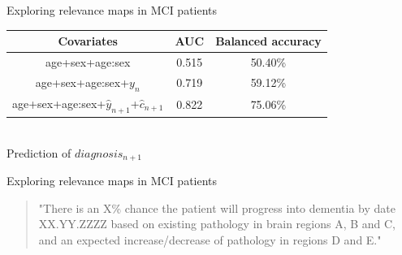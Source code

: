 \documentclass[t]{beamer}
\begin{document}
	\begin{frame}{Exploring relevance maps in MCI patients}
		\centering
		\vfill
		\begin{tabular}{|c|c|c|}
			\hline
			\textbf{Covariates}&\textbf{AUC}&\textbf{Balanced accuracy}\\
			\hline
			age+sex+age:sex&0.515&50.40\%\\
			\hline
			age+sex+age:sex+$y_{n}$&0.719&59.12\%\\
			\hline
			age+sex+age:sex+$\hat{y}_{n+1}$+$\hat{c}_{n+1}$&0.822&75.06\%\\
			\hline
		\end{tabular}\\
		\vspace{0.4cm}
		Prediction of $diagnosis_{n+1}$
		\vfill
	\end{frame}

	\begin{frame}{Exploring relevance maps in MCI patients}
		\centering
		\vfill
		\noindent
		\begin{quotation}
			"There is an X\% chance the patient will progress into dementia by date XX.YY.ZZZZ based on existing pathology in brain regions A, B and C, and an expected increase/decrease of pathology in regions D and E."
		\end{quotation}
		\vfill
	\end{frame}
\end{document}
